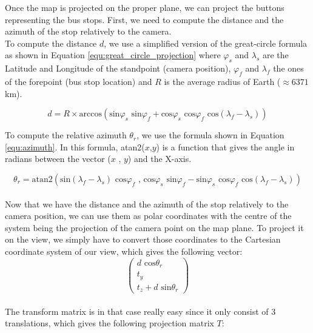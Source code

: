 Once the map is projected on the proper plane, we can project the buttons representing the bus stops. First, we need to compute the distance and the azimuth of the stop relatively to the camera.\\

To compute the distance $d$, we use a simplified version of the great-circle formula as shown in Equation \ref{equ:great_circle_projection} where $\varphi_s$ and $\lambda_s$ are the Latitude and Longitude of the standpoint (camera position), $\varphi_f$ and $\lambda_f$ the ones of the forepoint (bus stop location) and $R$ is the average radius of Earth ($\approx6371$km).

\begin{equation}
\label{equ:great_circle_projection}
d =  R \times \textrm{arccos}\left(\textrm{sin}\varphi_s \textrm{ sin}\varphi_f + \textrm{cos}\varphi_s \textrm{ cos}\varphi_f \textrm{ cos}(\lambda_f-\lambda_s)\right)
\end{equation}

To compute the relative azimuth $\theta_r$, we use the formula shown in Equation \ref{equ:azimuth}. In this formula, atan2($x${},{}$y$) is a function that gives the angle in radians between the vector ($x$ , $y$) and the X-axis.

\begin{equation}
\label{equ:azimuth}
\theta_r = \textrm{atan2}\left(\textrm{sin}( \lambda_f - \lambda_s)\textrm{ cos}\varphi_f\textrm{ , } \textrm{cos}\varphi_s \textrm{ sin}\varphi_f - \textrm{sin}\varphi_s \textrm{ cos}\varphi_f \textrm{ cos}(\lambda_f -\lambda_s)\right)
\end{equation}\\

Now that we have the distance and the azimuth of the stop relatively to the camera position, we can use them as polar coordinates with the centre of the system being the projection of the camera point on the map plane. To project it on the view, we simply have to convert those coordinates to the Cartesian coordinate system of our view, which gives the following vector:\\

\[\left(
\begin{array}{c}
d \textrm{ cos}\theta_r \\
t_y \\
t_z + d \textrm{ sin}\theta_r
\end{array}
\right)\]\\

The transform matrix is in that case really easy since it only consist of 3 translations, which gives the following projection matrix $T$:\\

